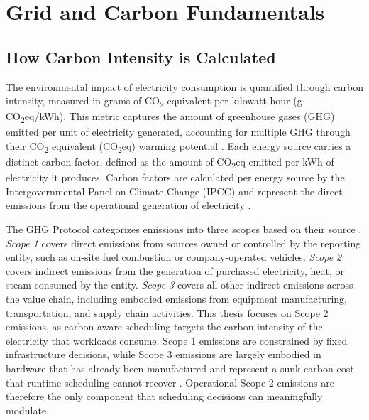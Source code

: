 
\section{Grid and Carbon Fundamentals}
\label{sec:background-fundamentals}

\subsection{How Carbon Intensity is Calculated}

The environmental impact of electricity consumption is quantified through carbon intensity, measured in grams of CO\textsubscript{2} equivalent per kilowatt-hour (g$\cdot$CO\textsubscript{2}eq/kWh).
This metric captures the amount of greenhouse gases (GHG) emitted per unit of electricity generated, accounting for multiple GHG through their CO\textsubscript{2} equivalent (CO\textsubscript{2}eq) warming potential \cite{ghg_protocol}.
Each energy source carries a distinct carbon factor, defined as the amount of CO\textsubscript{2}eq emitted per kWh of electricity it produces.
Carbon factors are calculated per energy source by the Intergovernmental Panel on Climate Change (IPCC) and represent the direct emissions from the operational generation of electricity \cite{ipcc_carbon_factors_2014}.

The GHG Protocol categorizes emissions into three scopes based on their source \cite{ghg_protocol}.
\textit{Scope 1} covers direct emissions from sources owned or controlled by the reporting entity, such as on-site fuel combustion or company-operated vehicles.
\textit{Scope 2} covers indirect emissions from the generation of purchased electricity, heat, or steam consumed by the entity.
\textit{Scope 3} covers all other indirect emissions across the value chain, including embodied emissions from equipment manufacturing, transportation, and supply chain activities.
This thesis focuses on Scope 2 emissions, as carbon-aware scheduling targets the carbon intensity of the electricity that workloads consume.
Scope 1 emissions are constrained by fixed infrastructure decisions, while Scope 3 emissions are largely embodied in hardware that has already been manufactured and represent a sunk carbon cost that runtime scheduling cannot recover \cite{bashir_sunk_2024}.
Operational Scope 2 emissions are therefore the only component that scheduling decisions can meaningfully modulate.

